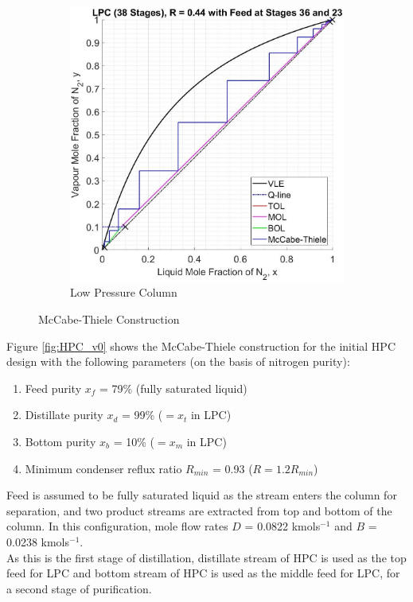 \begin{figure}[H]
\begin{subfigure}{0.49\textwidth}
                \includegraphics[width=\linewidth]{airseparation/graphics/LPC_v0.jpg}
                \caption{Low Pressure Column}
                \label{fig:LPC_v0}
            \end{subfigure}
            \caption{McCabe-Thiele Construction}                        \label{fig:mccabe_v0}
        \end{figure}
        \noindent Figure \ref{fig:HPC_v0} shows the McCabe-Thiele construction for the initial HPC design with the following parameters (on the basis of nitrogen purity):
        \begin{enumerate}
            \item Feed purity $x_f$ = 79\% (fully saturated liquid)
            \item Distillate purity $x_d$ = 99\% ($=x_t$ in LPC)
            \item Bottom purity $x_b$ = 10\% ($=x_m$ in LPC)
            \item Minimum condenser reflux ratio $R_{min}$ = 0.93 ($R = 1.2R_{min}$)
        \end{enumerate}
        Feed is assumed to be fully saturated liquid as the stream enters the column for separation, and two product streams are extracted from top and bottom of the column. In this configuration, mole flow rates $D$ = 0.0822 kmols$^{-1}$ and $B$ = 0.0238 kmols$^{-1}$. \\
        As this is the first stage of distillation, distillate stream of HPC is used as the top feed for LPC and bottom stream of HPC is used as the middle feed for LPC, for a second stage of purification.\\
        
